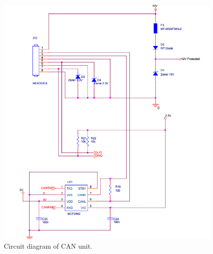 \begin{figure}[H]
\begin{center}
\includegraphics[width=14cm]{Figures/can.png}
\end{center}
\caption{Circuit diagram of CAN unit.}
\label{fig:can}
\end{figure}
